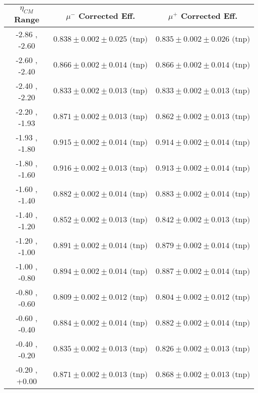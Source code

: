 \begin{table}[h!]
  \centering
  \renewcommand{\arraystretch}{1.5}
  \begin{tabular}{|c|*2c|}
    \hline
    $\eta_{CM}$ Range & $\mu^{-}$ Corrected Eff. & $\mu^{+}$ Corrected Eff.\\
    \hline\hline
    -2.86 , -2.60 & $0.838 \pm 0.002 \pm 0.025 \textrm{ (tnp)}$ & $0.835 \pm 0.002 \pm 0.026 \textrm{ (tnp)}$\\
    \hline
    -2.60 , -2.40 & $0.866 \pm 0.002 \pm 0.014 \textrm{ (tnp)}$ & $0.866 \pm 0.002 \pm 0.014 \textrm{ (tnp)}$\\
    \hline
    -2.40 , -2.20 & $0.833 \pm 0.002 \pm 0.013 \textrm{ (tnp)}$ & $0.833 \pm 0.002 \pm 0.013 \textrm{ (tnp)}$\\
    \hline
    -2.20 , -1.93 & $0.871 \pm 0.002 \pm 0.013 \textrm{ (tnp)}$ & $0.862 \pm 0.002 \pm 0.013 \textrm{ (tnp)}$\\
    \hline
    -1.93 , -1.80 & $0.915 \pm 0.002 \pm 0.014 \textrm{ (tnp)}$ & $0.914 \pm 0.002 \pm 0.014 \textrm{ (tnp)}$\\
    \hline
    -1.80 , -1.60 & $0.916 \pm 0.002 \pm 0.013 \textrm{ (tnp)}$ & $0.913 \pm 0.002 \pm 0.014 \textrm{ (tnp)}$\\
    \hline
    -1.60 , -1.40 & $0.882 \pm 0.002 \pm 0.014 \textrm{ (tnp)}$ & $0.883 \pm 0.002 \pm 0.014 \textrm{ (tnp)}$\\
    \hline
    -1.40 , -1.20 & $0.852 \pm 0.002 \pm 0.013 \textrm{ (tnp)}$ & $0.842 \pm 0.002 \pm 0.013 \textrm{ (tnp)}$\\
    \hline
    -1.20 , -1.00 & $0.891 \pm 0.002 \pm 0.014 \textrm{ (tnp)}$ & $0.879 \pm 0.002 \pm 0.014 \textrm{ (tnp)}$\\
    \hline
    -1.00 , -0.80 & $0.894 \pm 0.002 \pm 0.014 \textrm{ (tnp)}$ & $0.887 \pm 0.002 \pm 0.014 \textrm{ (tnp)}$\\
    \hline
    -0.80 , -0.60 & $0.809 \pm 0.002 \pm 0.012 \textrm{ (tnp)}$ & $0.804 \pm 0.002 \pm 0.012 \textrm{ (tnp)}$\\
    \hline
    -0.60 , -0.40 & $0.884 \pm 0.002 \pm 0.014 \textrm{ (tnp)}$ & $0.882 \pm 0.002 \pm 0.014 \textrm{ (tnp)}$\\
    \hline
    -0.40 , -0.20 & $0.835 \pm 0.002 \pm 0.013 \textrm{ (tnp)}$ & $0.826 \pm 0.002 \pm 0.013 \textrm{ (tnp)}$\\
    \hline
    -0.20 , +0.00 & $0.871 \pm 0.002 \pm 0.013 \textrm{ (tnp)}$ & $0.868 \pm 0.002 \pm 0.013 \textrm{ (tnp)}$\\
    \hline

\end{tabular}
\end{table}
